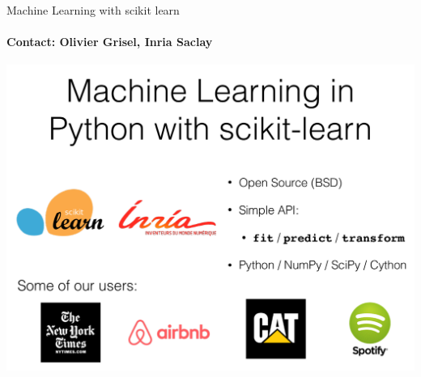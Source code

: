 \begin{frame}{Machine Learning with scikit learn}
\framesubtitle{Contact: Olivier Grisel, Inria Saclay}

\includegraphics[trim = 0mm 0mm 0mm 0mm, clip = TRUE, width=.7\linewidth]{Images/skl.png}

\end{frame}

